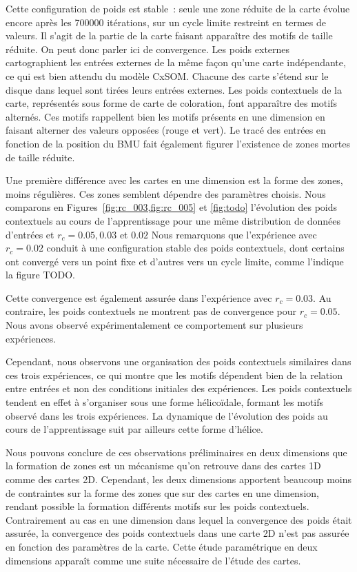 \documentclass[../main]{subfiles}
\begin{document}
Cette configuration de poids est stable~: seule une zone réduite de la carte évolue encore après les 700000 itérations, sur un cycle limite restreint en termes de valeurs. Il s'agit de la partie de la carte faisant apparaître des motifs de taille réduite.
On peut donc parler ici de convergence.
Les poids externes cartographient les entrées externes de la même façon qu'une carte indépendante, ce qui est bien attendu du modèle CxSOM. Chacune des carte s'étend sur le disque dans lequel sont tirées leurs entrées externes.
Les poids contextuels de la carte, représentés sous forme de carte de coloration, font apparaître des motifs alternés.
Ces motifs rappellent bien les motifs présents en une dimension en faisant alterner des valeurs opposées (rouge et vert).
Le tracé des entrées en fonction de la position du BMU fait également figurer l'existence de zones mortes de taille réduite.


Une première différence avec les cartes en une dimension est la forme des zones, moins régulières. Ces zones semblent dépendre des paramètres choisis.
Nous comparons en Figures~\ref{fig:rc_003,fig:rc_005} et \ref{fig:todo} l'évolution des poids contextuels au cours de l'apprentissage pour une même distribution de données d'entrées et $r_c = 0.05, 0.03$ et $0.02$
Nous remarquons que l'expérience avec $r_c = 0.02$ conduit à une configuration stable des poids contextuels, dont certains ont convergé vers un point fixe et d'autres vers un cycle limite, comme l'indique la figure TODO. 


Cette convergence est également assurée dans l'expérience avec $r_c = 0.03$. Au contraire, les poids contextuels ne montrent pas de convergence pour $r_c =0.05$.
Nous avons observé expérimentalement ce comportement sur plusieurs expériences.

Cependant, nous observons une organisation des poids contextuels similaires dans ces trois expériences, ce qui montre que les motifs dépendent bien de la relation entre entrées et non des conditions initiales des expériences. Les poids contextuels tendent en effet à s'organiser sous une forme hélicoïdale, formant les motifs observé dans les trois expériences.
La dynamique de l'évolution des poids au cours de l'apprentissage suit par ailleurs cette forme d'hélice. 

Nous pouvons conclure de ces observations préliminaires en deux dimensions que la formation de zones est un mécanisme qu'on retrouve dans des cartes 1D comme des cartes 2D. Cependant, les deux dimensions apportent beaucoup moins de contraintes sur la forme des zones que sur des cartes en une dimension, rendant possible la formation différents motifs sur les poids contextuels. 
Contrairement au cas en une dimension dans lequel la convergence des poids était assurée, la convergence des poids contextuels dans une carte 2D n'est pas assurée en fonction des paramètres de la carte. Cette étude paramétrique en deux dimensions apparaît comme une suite nécessaire de l'étude des cartes.
\end{document}
